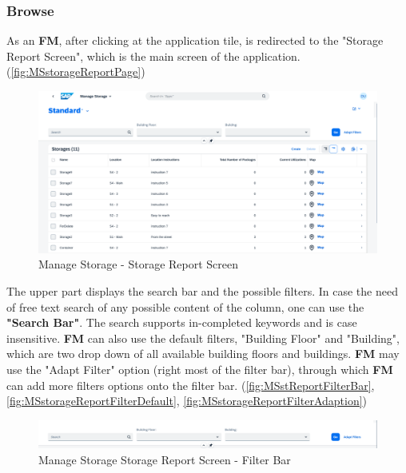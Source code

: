 \subsubsection{Browse}

As an \textbf{FM}, after clicking at the application tile, is redirected to the "Storage Report Screen", which is the main screen of the application. (\autoref{fig:MSstorageReportPage})

\begin{figure}[H]
	\centering
	\includegraphics[width=1\linewidth]{images/user_doc/storage/StorageReportPage/reportDefaultOverview.png}
	\caption{Manage Storage - Storage Report Screen}
	\label{fig:MSstorageReportPage}
\end{figure}

The upper part displays the search bar and the possible filters. 
In case the need of free text search of any possible content of the column, one can use the \textbf{"Search Bar"}. The search supports in-completed keywords and is case insensitive. 
\textbf{FM} can also use the default filters, "Building Floor" and "Building", which are two drop down of all available building floors and buildings. \textbf{FM} may use the "Adapt Filter" option (right most of the filter bar), through which \textbf{FM} can add more filters options onto the filter bar.
(\autoref{fig:MSstReportFilterBar}, 
\autoref{fig:MSstorageReportFilterDefault}, 
\autoref{fig:MSstorageReportFilterAdaption})

\begin{figure}[H]
	\centering
	\includegraphics[width=1\linewidth]{images/user_doc/storage/StorageReportPage/reportFilterBar.png}
	\caption{Manage Storage Storage Report Screen - Filter Bar}
	\label{fig:MSstReportFilterBar}
\end{figure}

